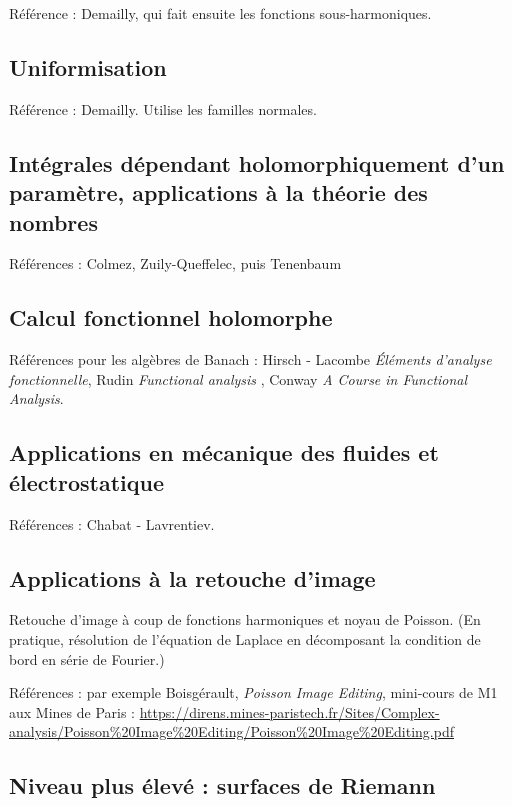 \documentclass[11pt,a4paper]{book}
\theoremstyle{definition}
\theoremstyle{plain}
\begin{document}
Référence : Demailly, qui fait ensuite les fonctions sous-harmoniques.

\subsection{Uniformisation}

Référence : Demailly. Utilise les familles normales.

\subsection{Intégrales dépendant holomorphiquement d'un paramètre, applications à la théorie des nombres}

Références : Colmez, Zuily-Queffelec, puis Tenenbaum

\subsection{Calcul fonctionnel holomorphe}

Références pour les algèbres de Banach : Hirsch - Lacombe \emph{Éléments d'analyse fonctionnelle}, Rudin \emph{Functional analysis} , Conway \emph{A Course in Functional Analysis}.

\subsection{Applications en mécanique des fluides et électrostatique}

Références : Chabat - Lavrentiev.

\subsection{Applications à la retouche d'image}

Retouche d'image à coup de fonctions harmoniques et noyau de Poisson. (En pratique, résolution de l'équation de Laplace en décomposant la condition de bord en série de Fourier.)

Références : par exemple Boisgérault, \emph{Poisson Image Editing}, mini-cours de M1 aux Mines de Paris : \url{https://direns.mines-paristech.fr/Sites/Complex-analysis/Poisson%20Image%20Editing/Poisson%20Image%20Editing.pdf} 

\subsection{Niveau plus élevé : surfaces de Riemann}
\end{document}
